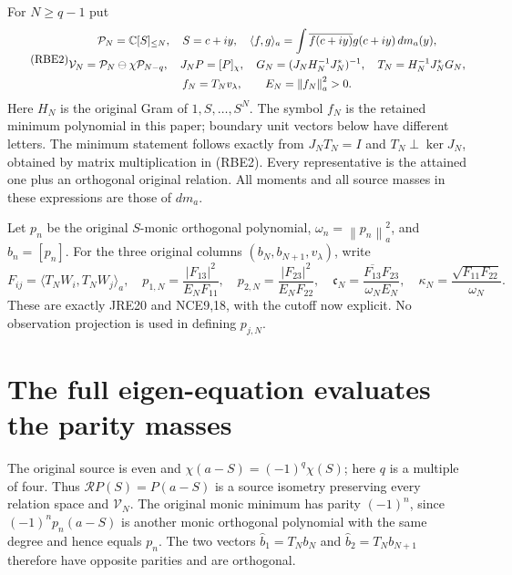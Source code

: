 \documentclass[11pt,a4paper]{article}
\providecommand{\PP}{\mathcal P}
\providecommand{\norm}[1]{\left\lVert#1\right\rVert}
\begin{document}
For \(N\ge q-1\) put
\begin{equation}\tag{RBE2}
 \begin{gathered}
 \PP_N=\C[S]_{\le N},\quad S=c+iy,\quad
 \langle f,g\rangle_a=\int\overline{f(c+iy)}g(c+iy)\,dm_a(y),\\
 \mathcal V_N=\PP_N\ominus\chi\PP_{N-q},\quad
 J_NP=[P]_\chi,\quad
 G_N=(J_NH_N^{-1}J_N^*)^{-1},\quad
 T_N=H_N^{-1}J_N^*G_N,\\
 f_N=T_Nv_\lambda,\qquad E_N=\norm{f_N}_a^2>0.
 \end{gathered}
\end{equation}
Here \(H_N\) is the original Gram of \(1,S,\ldots,S^N\).
The symbol \(f_N\) is the retained minimum polynomial in this
paper; boundary unit vectors below have different letters.
The minimum statement follows exactly from
\(J_NT_N=I\) and \(T_N\perp\ker J_N\), obtained by matrix
multiplication in (RBE2). Every representative is the attained
one plus an orthogonal original relation. All moments and all
source masses in these expressions are those of \(dm_a\).

Let \(p_n\) be the original \(S\)-monic orthogonal polynomial,
\(\omega_n=\norm{p_n}_a^2\), and \(b_n=[p_n]\).
For the three original columns \((b_N,b_{N+1},v_\lambda)\), write
\begin{equation}\tag{RBE3}
 F_{ij}=\langle T_NW_i,T_NW_j\rangle_a,\quad
 p_{1,N}=\frac{|F_{13}|^2}{E_NF_{11}},\quad
 p_{2,N}=\frac{|F_{23}|^2}{E_NF_{22}},\quad
 \mathfrak c_N=\frac{\overline{F_{13}}F_{23}}{\omega_NE_N},\quad
 \kappa_N=\frac{\sqrt{F_{11}F_{22}}}{\omega_N}.
\end{equation}
These are exactly JRE20 and NCE9,18, with the cutoff now explicit.
No observation projection is used in defining \(p_{j,N}\).

\section{The full eigen-equation evaluates the parity masses}

The original source is even and
\(\chi(a-S)=(-1)^q\chi(S)\); here \(q\) is a multiple of
four. Thus \(\mathcal R P(S)=P(a-S)\) is a source isometry
preserving every relation space and \(\mathcal V_N\).
The original monic minimum has parity \((-1)^n\), since
\((-1)^np_n(a-S)\) is another monic orthogonal polynomial
with the same degree and hence equals \(p_n\). The two vectors
\(\widehat b_1=T_Nb_N\) and \(\widehat b_2=T_Nb_{N+1}\)
therefore have opposite parities and are orthogonal.
\end{document}

